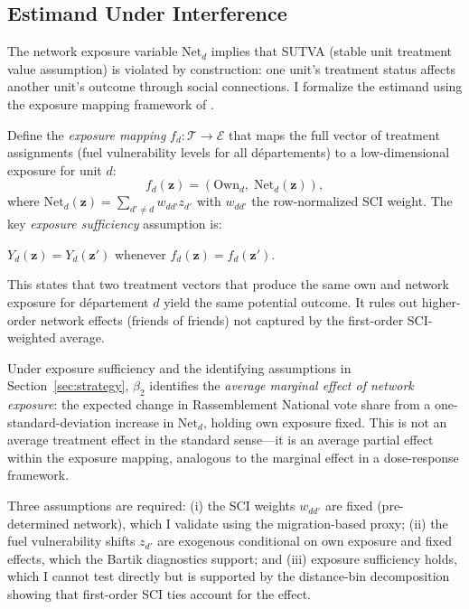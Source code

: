 \documentclass[12pt]{article}
\newcommand{\rn}{Rassemblement National}
\newcommand{\dept}{d\'{e}partement}
\newcommand{\depts}{d\'{e}partements}
\begin{document}
\subsection{Estimand Under Interference}
\label{sec:estimand}

The network exposure variable $\text{Net}_d$ implies that SUTVA (stable unit treatment value assumption) is violated by construction: one unit's treatment status affects another unit's outcome through social connections. I formalize the estimand using the exposure mapping framework of \citet{aronow2017estimating}.

Define the \emph{exposure mapping} $f_d: \mathcal{T} \to \mathcal{E}$ that maps the full vector of treatment assignments (fuel vulnerability levels for all \depts{}) to a low-dimensional exposure for unit $d$:
\begin{equation}
f_d(\mathbf{z}) = \left(\text{Own}_d, \; \text{Net}_d(\mathbf{z})\right),
\label{eq:exposure_mapping}
\end{equation}
where $\text{Net}_d(\mathbf{z}) = \sum_{d' \neq d} w_{dd'} z_{d'}$ with $w_{dd'}$ the row-normalized SCI weight. The key \emph{exposure sufficiency} assumption is:
\begin{assumption}
$Y_d(\mathbf{z}) = Y_d(\mathbf{z}')$ whenever $f_d(\mathbf{z}) = f_d(\mathbf{z}')$.
\end{assumption}
This states that two treatment vectors that produce the same own and network exposure for \dept{} $d$ yield the same potential outcome. It rules out higher-order network effects (friends of friends) not captured by the first-order SCI-weighted average.

Under exposure sufficiency and the identifying assumptions in Section~\ref{sec:strategy}, $\beta_2$ identifies the \emph{average marginal effect of network exposure}: the expected change in \rn{} vote share from a one-standard-deviation increase in $\text{Net}_d$, holding own exposure fixed. This is not an average treatment effect in the standard sense---it is an average partial effect within the exposure mapping, analogous to the marginal effect in a dose-response framework.

Three assumptions are required: (i) the SCI weights $w_{dd'}$ are fixed (pre-determined network), which I validate using the migration-based proxy; (ii) the fuel vulnerability shifts $z_{d'}$ are exogenous conditional on own exposure and fixed effects, which the Bartik diagnostics support; and (iii) exposure sufficiency holds, which I cannot test directly but is supported by the distance-bin decomposition showing that first-order SCI ties account for the effect.
\end{document}
